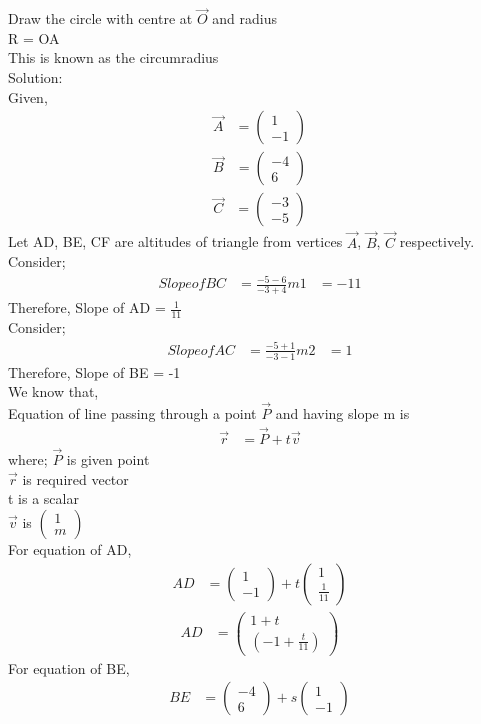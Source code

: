 \documentclass[journal,12pt,onecolumn]{IEEEtran}
\newcommand{\myvec}[1]{\ensuremath{\begin{pmatrix}#1\end{pmatrix}}}
\begin{document}
Draw the circle with centre at $\vec{O}$ and radius\\
R = OA\\
This is known as the circumradius\\
Solution:\\
Given,\\
\begin{align}
\vec{A} &= \myvec{1\\-1}
\end{align}
\begin{align}
\vec{B} &= \myvec{-4\\6}
\end{align}
\begin{align}
\vec{C} &= \myvec{-3\\-5}
\end{align}
Let AD, BE, CF are altitudes of triangle from vertices $\vec{A}$, $\vec{B}$, $\vec{C}$ respectively.\\
Consider;
\begin{align}
Slope of BC &= \frac{-5-6}{-3+4}
                m1 &= -11
\end{align}
Therefore, Slope of AD = $\frac{1}{11}$\\
Consider;
\begin{align}
Slope of AC &= \frac{-5+1}{-3-1}
                m2 &= 1
\end{align}
Therefore, Slope of BE = -1\\
We know that,\\
Equation of line passing through a point $\vec{P}$ and having slope m is
\begin{align}
       \vec{r} &= \vec{P} + t\vec{v}
\end{align}
where; $\vec{P}$ is given point\\
       $\vec{r}$ is required vector\\
       t is a scalar\\
       $\vec{v}$ is \myvec{1\\m}\\
For equation of AD,
\begin{align}
       AD &= \myvec{1\\-1} + t\myvec{1\\\frac{1}{11}}
\end{align}
\begin{align}
       AD &= \myvec{1+t\\\left(-1+\frac{t}{11}\right)}
\end{align}
For equation of BE,
\begin{align}
       BE &= \myvec{-4\\6} + s\myvec{1\\-1}
\end{align}
\end{document}
